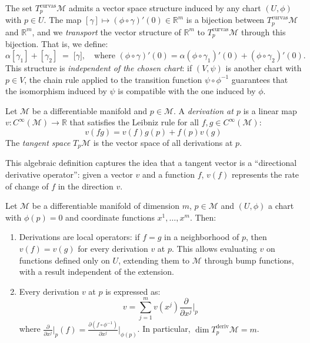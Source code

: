 \begin{remark}\label{rem:estructura_vectorial_curvas}
The set $T_p^{\text{curvas}}\mathcal{M}$ admits a vector space structure induced by any chart $(U, \phi)$ with $p \in U$. The map $[\gamma] \mapsto (\phi \circ \gamma)'(0) \in \mathbb{R}^m$ is a bijection between $T_p^{\text{curvas}}\mathcal{M}$ and $\mathbb{R}^m$, and we \textit{transport} the vector structure of $\mathbb{R}^m$ to $T_p^{\text{curvas}}\mathcal{M}$ through this bijection. That is, we define:
\[
\alpha[\gamma_1] + [\gamma_2] \;=\; \bigl[\gamma\bigr], \quad \text{where $(\phi \circ \gamma)'(0) = \alpha(\phi \circ \gamma_1)'(0) + (\phi \circ \gamma_2)'(0)$}.
\]
This structure is \textit{independent of the chosen chart}: if $(V, \psi)$ is another chart with $p \in V$, the chain rule applied to the transition function $\psi \circ \phi^{-1}$ guarantees that the isomorphism induced by $\psi$ is compatible with the one induced by $\phi$.
\end{remark}

\begin{definition}\label{def:espacio_tangente_derivaciones}
Let $\mathcal{M}$ be a differentiable manifold and $p \in \mathcal{M}$. A \textit{derivation at $p$} is a linear map $v: C^\infty(\mathcal{M}) \to \mathbb{R}$ that satisfies the Leibniz rule for all $f, g \in C^\infty(\mathcal{M})$:
\[
v(fg) = v(f)g(p) + f(p)v(g)
\]
The \textit{tangent space} $T_p\mathcal{M}$ is the vector space of all derivations at $p$.
\end{definition}

This algebraic definition captures the idea that a tangent vector is a ``directional derivative operator'': given a vector $v$ and a function $f$, $v(f)$ represents the rate of change of $f$ in the direction $v$.

\begin{lemma}\label{lem:descomposicion_derivaciones}
Let $\mathcal{M}$ be a differentiable manifold of dimension $m$, $p \in \mathcal{M}$ and $(U, \phi)$ a chart with $\phi(p) = 0$ and coordinate functions $x^1, \ldots, x^m$. Then:
\begin{enumerate}
	\item Derivations are local operators: if $f = g$ in a neighborhood of $p$, then $v(f) = v(g)$ for every derivation $v$ at $p$. This allows evaluating $v$ on functions defined only on $U$, extending them to $\mathcal{M}$ through bump functions, with a result independent of the extension.
	\item Every derivation $v$ at $p$ is expressed as:
	\[
	v = \sum_{j=1}^{m} v(x^j) \frac{\partial}{\partial x^j}\bigg|_p
	\]
	where $\frac{\partial}{\partial x^j}\big|_p(f) = \frac{\partial(f \circ \phi^{-1})}{\partial x^j}\big|_{\phi(p)}$. In particular, $\dim T_p^{\text{deriv}}\mathcal{M} = m$.
\end{enumerate}
\end{lemma}

